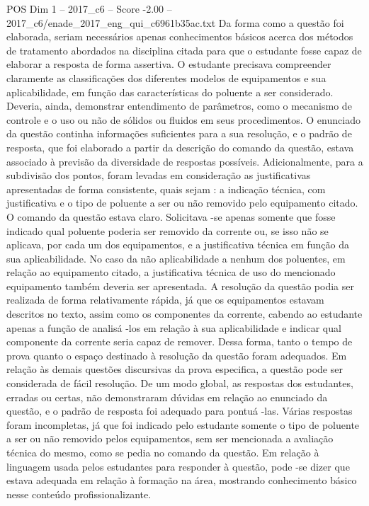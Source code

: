 \begin{textsample}{POS Dim 1 – 2017\_c6 – Score -2.00 – 2017\_c6/enade\_2017\_eng\_qui\_c6961b35ac.txt}
Da forma como a questão foi elaborada, seriam necessários apenas conhecimentos básicos acerca dos métodos de tratamento abordados na disciplina citada para que o estudante fosse capaz de elaborar a resposta de forma assertiva.
O estudante precisava compreender claramente as classificações dos diferentes modelos de equipamentos e sua aplicabilidade, em função das características do poluente a ser considerado.
Deveria, ainda, demonstrar entendimento de parâmetros, como o mecanismo de controle e o uso ou não de sólidos ou fluidos em seus procedimentos.
O enunciado da questão continha informações suficientes para a sua resolução, e o padrão de resposta, que foi elaborado a partir da descrição do comando da questão, estava associado à previsão da diversidade de respostas possíveis.
Adicionalmente, para a subdivisão dos pontos, foram levadas em consideração as justificativas apresentadas de forma consistente, quais sejam : a indicação técnica, com justificativa e o tipo de poluente a ser ou não removido pelo equipamento citado.
O comando da questão estava claro.
Solicitava -se apenas somente que fosse indicado qual poluente poderia ser removido da corrente ou, se isso não se aplicava, por cada um dos equipamentos, e a justificativa técnica em função da sua aplicabilidade.
No caso da não aplicabilidade a nenhum dos poluentes, em relação ao equipamento citado, a justificativa técnica de uso do mencionado equipamento também deveria ser apresentada.
A resolução da questão podia ser realizada de forma relativamente rápida, já que os equipamentos estavam descritos no texto, assim como os componentes da corrente, cabendo ao estudante apenas a função de analisá -los em relação à sua aplicabilidade e indicar qual componente da corrente seria capaz de remover.
Dessa forma, tanto o tempo de prova quanto o espaço destinado à resolução da questão foram adequados.
Em relação às demais questões discursivas da prova especifica, a questão pode ser considerada de fácil resolução.
De um modo global, as respostas dos estudantes, erradas ou certas, não demonstraram dúvidas em relação ao enunciado da questão, e o padrão de resposta foi adequado para pontuá -las.
Várias respostas foram incompletas, já que foi indicado pelo estudante somente o tipo de poluente a ser ou não removido pelos equipamentos, sem ser mencionada a avaliação técnica do mesmo, como se pedia no comando da questão.
Em relação à linguagem usada pelos estudantes para responder à questão, pode -se dizer que estava adequada em relação à formação na área, mostrando conhecimento básico nesse conteúdo profissionalizante.

\end{textsample}
